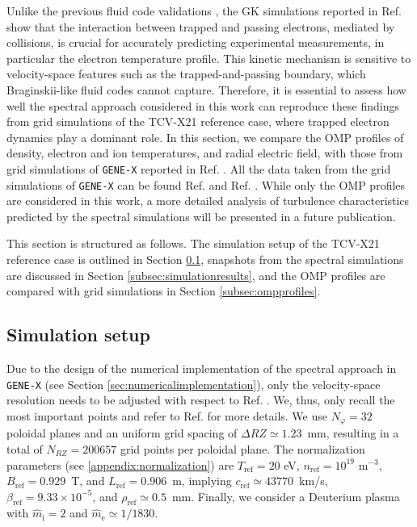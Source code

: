 \documentclass[preprint,12pt]{elsarticle}
\newcommand{\csref}{c_{\mathrm{ref}}}
\newcommand{\nref}{n_{\mathrm{ref}}}
\newcommand{\Lref}{L_{\mathrm{ref}}}
\newcommand{\rhoref}{\rho_{\mathrm{ref}}}
\newcommand{\Bref}{B_{\mathrm{ref}}}
\newcommand{\Tref}{T_{\mathrm{ref}}}
\newcommand{\betaref}{\beta_{\mathrm{ref}}}
\begin{document}
Unlike the previous fluid code validations \cite{oliveira2022}, the GK simulations reported in Ref. \cite{ulbl2023} show that the interaction between trapped and passing electrons, mediated by collisions, is crucial for accurately predicting experimental measurements, in particular the electron temperature profile. This kinetic mechanism is sensitive to velocity-space features such as the trapped-and-passing boundary, which Braginskii-like fluid codes cannot capture. Therefore, it is essential to assess how well the spectral approach considered in this work can reproduce these findings from grid simulations of the TCV-X21 reference case, where trapped electron dynamics play a dominant role. In this section, we compare the OMP profiles of density, electron and ion temperatures, and radial electric field, with those from grid simulations of \verb|GENE-X| reported in Ref. \cite{ulbl2023}. All the data taken from the grid simulations of \verb|GENE-X| can be found Ref. \cite{tcvx21zenodo} and Ref. \cite{ulbl2023phd}. While only the OMP profiles are considered in this work, a more detailed analysis of turbulence characteristics predicted by the spectral simulations will be presented in a future publication.

This section is structured as follows. The simulation setup of the TCV-X21 reference case is outlined in Section \ref{subsec:simulationsetup}, snapshots from the spectral simulations are discussed in Section \ref{subsec:simulationresults}, and the OMP profiles are compared with grid simulations in Section \ref{subsec:ompprofiles}. 

\subsection{Simulation setup}
\label{subsec:simulationsetup}

 Due to the design of the numerical implementation of the spectral approach in \verb|GENE-X| (see Section \ref{sec:numericalimplementation}), only the velocity-space resolution needs to be adjusted with respect to Ref. \cite{ulbl2023}. We, thus, only recall the most important points and refer to Ref. \cite{ulbl2023} for more details. We use $N_\varphi = 32$ poloidal planes and an uniform grid spacing of $\Delta RZ \simeq 1.23$~mm, resulting in a total of $N_{RZ} = 200657$ grid points per poloidal plane. The normalization parameters (see \ref{appendix:normalization}) are $\Tref = 20$ eV, $\nref = 10^{19 }$ m$^{-3}$, $\Bref = 0.929$~T, and $\Lref = 0.906$~m, implying $\csref \simeq 43770$~km/s, $\betaref = 9.33 \times 10^{-5}$, and $\rhoref \simeq 0.5$~mm. Finally, we consider a Deuterium plasma with $\hat m_{\mathrm{i}} = 2$ and $\hat m_{\mathrm{e}} \simeq 1/1830$. 
\end{document}
